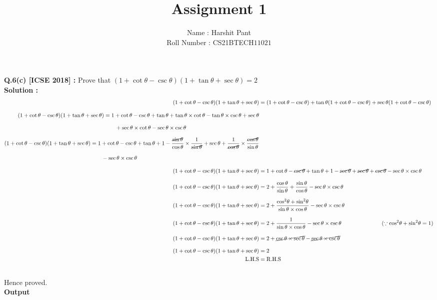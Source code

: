 \documentclass[journal,12pt,twocolumn]{IEEEtran}
\title{\textbf{\Huge{Assignment 1}}}
\author{\Large{Name : Harshit Pant}\\\Large{Roll Number : CS21BTECH$11021$}}
\date{}
\begin{document}
\maketitle
\setlength{\parindent}{0cm}
\textbf{Q.6(c) [ICSE 2018] :}
Prove that $(1 +\cot\theta -\csc\theta)(1 + \tan\theta +\sec\theta)=2$\\

\textbf{Solution : }
\begin{align*}
(1+ \cot\theta -\csc\theta)(1+\tan\theta+\sec\theta)&=(1+\cot\theta-\csc\theta)+\tan\theta(1+\cot\theta-\csc\theta)+\sec\theta(1+\cot\theta-\csc\theta)\\[.1in]
\begin{split}
(1+ \cot\theta -\csc\theta)(1+\tan\theta+\sec\theta)&=1+\cot\theta-\csc\theta+\tan\theta+\tan\theta\times\cot\theta-\tan\theta\times\csc\theta+\sec\theta\\[.1in]
&\qquad
+\sec\theta\times\cot\theta-\sec\theta\times\csc\theta
\end{split}\\[.1in]
\begin{split}
(1+ \cot\theta -\csc\theta)(1+\tan\theta+\sec\theta)&=\displaystyle{1+\cot\theta-\csc\theta+\tan\theta+1-\frac{\cancel{\sin\theta}}{\cos\theta}\times\frac{1}{\cancel{\sin\theta}}+\sec\theta+\frac{1}{\cancel{\cos\theta}}\times\frac{\cancel{\cos\theta}}{\sin\theta}}\\[.1in]
&\qquad
-\sec\theta\times\csc\theta
\end{split}
\\[.1in]
(1+ \cot\theta -\csc\theta)(1+\tan\theta+\sec\theta)&=1+\cot\theta-\cancel{\csc\theta}+\tan\theta+1-\cancel{\sec\theta}+\cancel{\sec\theta}+\cancel{\csc\theta}-\sec\theta\times\csc\theta\\[.1in]
(1+ \cot\theta -\csc\theta)(1+\tan\theta+\sec\theta)&=2+\dfrac{\cos\theta}{\sin\theta}+\dfrac{\sin\theta}{\cos\theta}-\sec\theta\times\csc\theta\\[.1in]
(1+ \cot\theta -\csc\theta)(1+\tan\theta+\sec\theta)&=\displaystyle{2+\dfrac{{\cos}^2\theta+{\sin}^2\theta}{\sin\theta\times\cos\theta}-\sec\theta\times\csc\theta}\\[.1in]
(1+ \cot\theta -\csc\theta)(1+\tan\theta+\sec\theta)&=\displaystyle{2+\frac{1}{\sin\theta\times\cos\theta}-\sec\theta\times\csc\theta}\hspace{1in}
(\because{\cos}^2\theta+{\sin}^2\theta=1)\\[.1in]
(1+ \cot\theta -\csc\theta)(1+\tan\theta+\sec\theta)&=\displaystyle{2+\cancel{\csc\theta\times\sec\theta}-\cancel{\sec\theta\times\csc\theta}}\\[.1in]
(1+ \cot\theta -\csc\theta)(1+\tan\theta+\sec\theta)&=2\\
\text{L.H.S}&=\text{R.H.S}
\end{align*}
\\[.03in]
Hence proved.\\[.1in]
\textbf{\Large{Output}}
\end{document}
